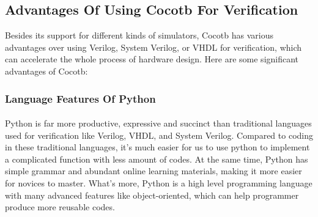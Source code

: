 \documentclass{article}
\begin{document}
\subsection{Advantages Of Using Cocotb For Verification}
Besides its support for different kinds of simulators, Cocotb has various advantages over using Verilog, System Verilog, or VHDL for verification, which can accelerate the whole process of hardware design. Here are some significant advantages of Cocotb:

\subsubsection{Language Features Of Python}
\paragraph{}
Python is far more productive, expressive and succinct than traditional languages used for verification like Verilog, VHDL, and System Verilog. Compared to coding in these traditional  languages, it’s much easier for us to use python to implement a complicated function with less amount of codes. At the same time, Python has simple grammar and abundant online learning materials, making it more easier for novices to master. What’s more, Python is a high level programming language with many advanced features like object-oriented, which can help programmer produce more reusable codes.
\end{document}
